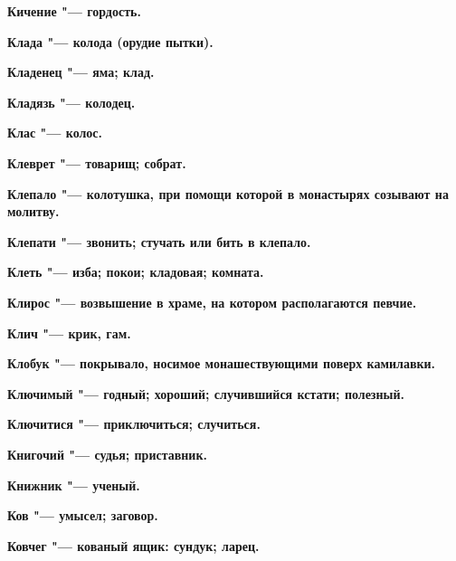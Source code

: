 \begin{mymulticols}{2}
\bfseries Кичение\normalfont{} "--- гордость. 




\bfseries Клада\normalfont{} "--- колода (орудие пытки). 




\bfseries Кладенец\normalfont{} "--- яма; клад. 




\bfseries Кладязь\normalfont{} "--- колодец. 




\bfseries Клас\normalfont{} "--- колос. 




\bfseries Клеврет\normalfont{} "--- товарищ; собрат. 




\bfseries Клепало\normalfont{} "--- колотушка, при помощи которой в монастырях созывают на молитву. 




\bfseries Клепати\normalfont{} "--- звонить; стучать или бить в клепало. 




\bfseries Клеть\normalfont{} "--- изба; покои; кладовая; комната. 




\bfseries Клирос\normalfont{} "--- возвышение в храме, на котором располагаются певчие. 




\bfseries Клич\normalfont{} "--- крик, гам. 




\bfseries Клобук\normalfont{} "--- покрывало, носимое монашествующими поверх камилавки. 




\bfseries Ключимый\normalfont{} "--- годный; хороший; случившийся кстати; полезный. 




\bfseries Ключитися\normalfont{} "--- приключиться; случиться. 




\bfseries Книгочий\normalfont{} "--- судья; приставник. 




\bfseries Книжник\normalfont{} "--- ученый. 




\bfseries Ков\normalfont{} "--- умысел; заговор. 




\bfseries Ковчег\normalfont{} "--- кованый ящик: сундук; ларец. 





\end{mymulticols}
